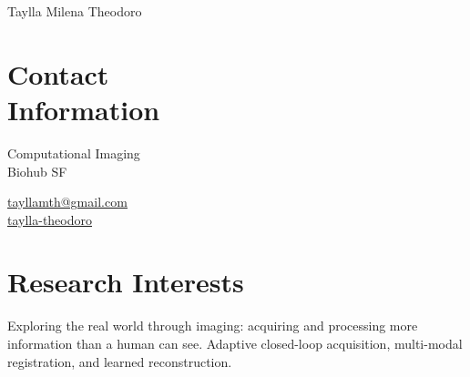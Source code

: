 \documentclass[margin,line]{resume}
\begin{document}
{\large Taylla Milena Theodoro}
\begin{resume}



    \section{\mysidestyle Contact \\Information}
    \begin{minipage}[t]{0.7\textwidth}
        Computational Imaging \\
        Biohub SF\\
    \end{minipage}\hfill
    \begin{minipage}[t]{0.7\textwidth}
        \href{mailto:tayllamth@gmail.com}
        {\underline{tayllamth@gmail.com}} \\
        \href{https://www.linkedin.com/in/taylla-theodoro/}{\underline{taylla-theodoro}} 
    \end{minipage}
   \vspace{-0.2cm}
    \section{\mysidestyle Research Interests}
    Exploring the real world through imaging: acquiring and processing more information than a human can see. Adaptive closed-loop acquisition, multi-modal registration, and learned reconstruction.
   \vspace{-0.2cm}

\end{resume}
\end{document}

